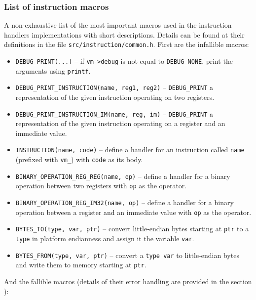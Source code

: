 \documentclass[10pt,a4paper,final]{article}
\newcommand{\code}[1]{\texttt{#1}}
\begin{document}
\subsubsection{List of instruction macros}
\label{sec:macroslist}

A non-exhaustive list of the most important macros used in the instruction
handlers implementations with short descriptions. Details can be found at their
definitions in the file \code{src/instruction/common.h}. First are the
infallible macros:

\begin{itemize}
  \item \code{DEBUG_PRINT(...)} -- if \code{vm->debug} is not equal to
    \code{DEBUG_NONE}, print the arguments using \code{printf}.
  \item \code{DEBUG_PRINT_INSTRUCTION(name, reg1, reg2)} -- \code{DEBUG_PRINT}
    a representation of the given instruction operating on two registers.
  \item \code{DEBUG_PRINT_INSTRUCTION_IM(name, reg, im)} -- \code{DEBUG_PRINT}
    a representation of the given instruction operating on a register and an
    immediate value.

  \item \code{INSTRUCTION(name, code)} -- define a handler for an instruction
    called \code{name} (prefixed with \code{vm_}) with \code{code} as its
    body.
  \item \code{BINARY_OPERATION_REG_REG(name, op)} -- define a handler for a
    binary operation between two registers with \code{op} as the operator.
  \item \code{BINARY_OPERATION_REG_IM32(name, op)} -- define a handler for a
    binary operation between a register and an immediate value with
    \code{op} as the operator.

  \item \code{BYTES_TO(type, var, ptr)} -- convert little-endian bytes
    starting at \code{ptr} to a \code{type} in platform endianness and
    assign it the variable \code{var}.
  \item \code{BYTES_FROM(type, var, ptr)} -- convert a \code{type var} to
    little-endian bytes and write them to memory starting at \code{ptr}.
\end{itemize}

And the fallible macros (details of their error handling are provided in the
section ):
\end{document}
